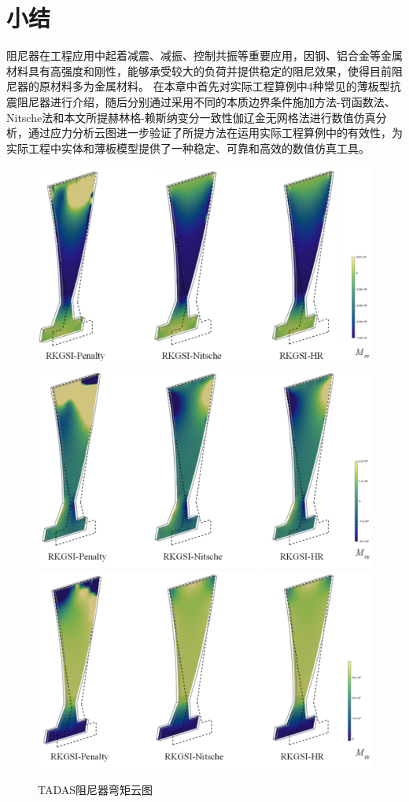 \section{小结}
阻尼器在工程应用中起着减震、减振、控制共振等重要应用，因钢、铝合金等金属材料具有高强度和刚性，能够承受较大的负荷并提供稳定的阻尼效果，使得目前阻尼器的原材料多为金属材料。
在本章中首先对实际工程算例中4种常见的薄板型抗震阻尼器进行介绍，随后分别通过采用不同的本质边界条件施加方法-罚函数法、Nitsche法和本文所提赫林格-赖斯纳变分一致性伽辽金无网格法进行数值仿真分析，通过应力分析云图进一步验证了所提方法在运用实际工程算例中的有效性，为实际工程中实体和薄板模型提供了一种稳定、可靠和高效的数值仿真工具。
\begin{figure}[H]
    \centering
        \includegraphics[scale=0.5]{figure/DAMPER/TADAS/M11.png}
        \includegraphics[scale=0.5]{figure/DAMPER/TADAS/M12.png}
        \includegraphics[scale=0.5]{figure/DAMPER/TADAS/M22.png}
    \caption{TADAS阻尼器弯矩云图}\label{TADASM}
\end{figure}


